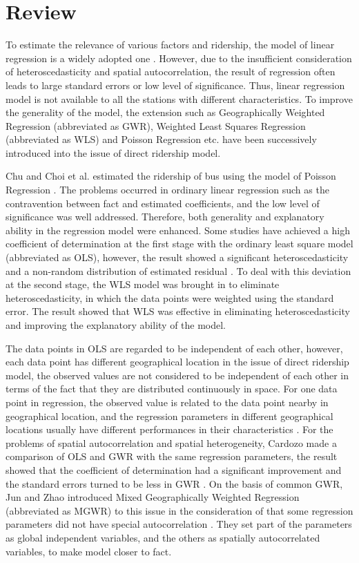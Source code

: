 \section{Review}
To estimate the relevance of various factors and ridership, the model of linear regression is a widely adopted one \cite{cervero1997travel,chakraborty2013land}. However, due to the insufficient consideration of heteroscedasticity and spatial autocorrelation, the result of regression often leads to large standard errors or low level of significance. Thus, linear regression model is not available to all the stations with different characteristics. To improve the generality of the model, the extension such as Geographically Weighted Regression (abbreviated as GWR), Weighted Least Squares Regression (abbreviated as WLS) and Poisson Regression etc. have been successively introduced into the issue of direct ridership model. 

Chu and Choi et al. estimated the ridership of bus using the model of Poisson Regression \cite{choi2012analysis,chu2004ridership}. The problems occurred in ordinary linear regression such as the contravention between fact and estimated coefficients, and the low level of significance was well addressed. Therefore, both generality and explanatory ability in the regression model were enhanced. Some studies have achieved a high coefficient of determination at the first stage with the ordinary least square model (abbreviated as OLS), however, the result showed a significant heteroscedasticity and a non-random distribution of estimated residual \cite{kuby2004factors}. To deal with this deviation at the second stage, the WLS model was brought in to eliminate heteroscedasticity, in which the data points were weighted using the standard error. The result showed that WLS was effective in eliminating heteroscedasticity and improving the explanatory ability of the model.

The data points in OLS are regarded to be independent of each other, however, each data point has different geographical location in the issue of direct ridership model, the observed values are not considered to be independent of each other in terms of the fact that they are distributed continuously in space. For one data point in regression, the observed value is related to the data point nearby in geographical location, and the regression parameters in different geographical locations usually have different performances in their characteristics \cite{brunsdon1996geographically}. For the problems of spatial autocorrelation and spatial heterogeneity, Cardozo made a comparison of OLS and GWR with the same regression parameters, the result showed that the coefficient of determination had a significant improvement and the standard errors turned to be less in GWR \cite{cardozo2012application}. On the basis of common GWR, Jun and Zhao introduced Mixed Geographically Weighted Regression (abbreviated as MGWR) to this issue in the consideration of that some regression parameters did not have special autocorrelation \cite{jun2015land,zhao2005transit}. They set part of the parameters as global independent variables, and the others as spatially autocorrelated variables, to make model closer to fact.

